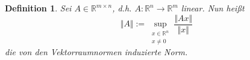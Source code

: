 \documentclass[12pt]{article}
\theoremstyle{break}
\newtheorem{definition}[theorem]{Definition}
\newtheorem{comment}[theorem]{Bemerkung}
\begin{document}
\begin{definition}
Sei $A\in \mathbb{R}^{m \times n}$, d.h. $A\colon \mathbb{R}^n \rightarrow \mathbb{R}^m$ linear. Nun heißt
$$\Vert A \Vert := \sup_{\substack{x \in \mathbb{R}^n \\ x \neq 0}} \frac{\Vert Ax \Vert}{\Vert x\Vert}$$
die von den Vektorraumnormen induzierte Norm.
\end{definition}

\begin{comment}
Sei $A \in \mathbb{R}^{n\times m}$, $\alpha \in \mathbb{R}$. Es gilt für die in (18.3) definierte Matrixnorm
\begin{enumerate}
  \item[i)] $\forall x \in \mathbb{R}^n: \medspace \Vert Ax \Vert \leq \Vert A \Vert \Vert x \Vert$ \\
  $\Vert A \Vert$ ist die kleinste Zahl mit dieser Eigenschaft.
  \item[ii)] Es gilt $\Vert A \Vert \geq 0$. Weiter gilt $\Vert A \Vert = 0 \Rightarrow \medspace A = 0$
  \item[iii)] $\Vert \alpha A \Vert = \vert \alpha \vert \Vert A \Vert$
  \item[iv)] $\Vert A + B \Vert \leq \Vert A \Vert + \Vert B \Vert$.\\
	Damit ist $\Vert \cdot \Vert$ tatsächlich eine Norm.
  \item[v)] $\Vert I \Vert = 1$ falls $m=n$, $\Vert \cdot \Vert_{\mathbb{R}^m} = \Vert \cdot \Vert_{\mathbb{R}^n}$
  \item[vi)] $\Vert AB \Vert \leq \Vert A \Vert \thinspace \Vert B \Vert$ (Submultiplikativität)
\end{enumerate}
\end{comment}
\end{document}
